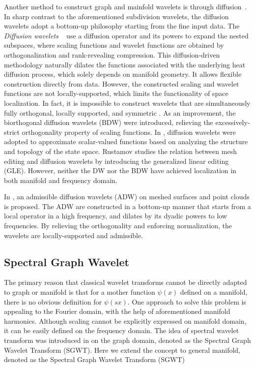 Another method to construct graph and mainfold wavelets is
through diffusion~\cite{Coifman2006, Hou2013}.
In sharp contrast to the aforementioned subdivision wavelets, the diffusion
wavelets adopt a bottom-up philosophy starting from the fine input data.
The \emph{Diffusion wavelets} ~\cite{Coifman2006} use a diffusion operator
and its powers to expand the nested subspaces, where scaling functions and
wavelet functions are obtained by orthogonalization and rank-revealing
compression. This diffusion-driven methodology naturally dilates the
functions associated with the underlying heat diffusion process, which solely
depends on manifold geometry. It allows flexible construction directly from data.
However, the constructed scaling and wavelet functions are not locally-supported,
which limits the functionality of space localization. In fact, it is impossible
to construct wavelets that are simultaneously fully orthogonal, locally supported,
and symmetric \cite{Lounsbery:1997:TOG}. As an improvement, the biorthogonal
diffusion wavelets (BDW) \cite{Maggioni:2005:SPIE} were introduced, relieving the
excessively-strict orthogonality property of scaling functions.
In \cite{Mahadevan2005}, diffusion wavelets were adopted to approximate
scalar-valued functions based on analyzing the structure and topology of the
state space. Rustamov \cite{Rustamov:2009:ICMS} studies the relation between
mesh editing and diffusion wavelets by introducing the generalized linear
editing (GLE). However, neither the DW nor the BDW have achieved localization
in both manifold and frequency domain.

In \cite{Hou2013}, an admissible diffusion wavelets (ADW) on meshed surfaces and point clouds is proposed.
The ADW are constructed in a bottom-up manner that starts from a local operator in a high frequency,
and dilates by its dyadic powers to low frequencies. By relieving the orthogonality and enforcing normalization,
the wavelets are locally-supported and admissible.

\subsection{Spectral Graph Wavelet}
The primary reason that classical wavelet transforms cannot be directly adapted to graph or manifold is
that for a mother function $\psi(x)$ defined on a manifold,
there is no obvious definition for $\psi(sx)$. One approach to solve this problem is appealing to the Fourier domain,
with the help of aforementioned manifold harmonics. Although scaling cannot be explicitly expressed on manifold domain,
it can be easily defined on the frequency domain. The idea of spectral wavelet transform was introduced in \cite{Hammond2011}
on the graph domain, denoted as the Spectral Graph Wavelet Transform (SGWT). Here we extend the concept to general manifold,
denoted as the Spectral Graph Wavelet Transform (SGWT)

